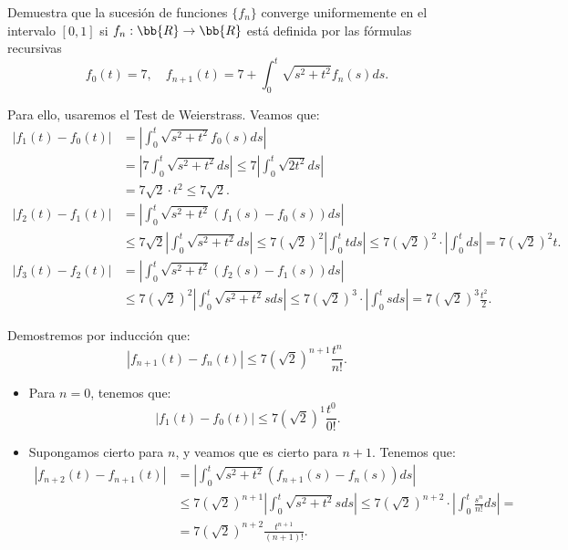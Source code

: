 \documentclass[12pt]{article}
\begin{document}
    \begin{ejercicio}
        Demuestra que la sucesión de funciones $\{f_n\}$ converge uniformemente en el intervalo $[0,1]$ si $f_n: \bb{R} \to \bb{R}$ está definida por las fórmulas recursivas
        \[
            f_0(t) = 7, \quad f_{n+1}(t) = 7 + \int_0^t \sqrt{s^2+t^2}f_n(s)ds.
        \]

        Para ello, usaremos el Test de Weierstrass. Veamos que:
        \begin{align*}
            |f_{1}(t)-f_0(t)|
            &= \left|\int_0^t \sqrt{s^2+t^2}f_0(s)ds\right| \\
            &= \left|7\int_0^t \sqrt{s^2+t^2}ds\right|
            \leq 7\left|\int_0^t \sqrt{2t^2}ds\right| \\
            &= 7\sqrt{2}\cdot t^2\leq 7\sqrt{2}.\\
            |f_2(t)-f_1(t)|
            &= \left|\int_0^t \sqrt{s^2+t^2}(f_1(s)-f_0(s))ds\right| \\
            &\leq 7\sqrt{2}\left|\int_0^t \sqrt{s^2+t^2}ds\right|
            \leq 7(\sqrt{2})^2\left|\int_0^t t ds\right|	
            \leq 7(\sqrt{2})^2 \cdot \left|\int_0^t ds\right|
            = 7(\sqrt{2})^2t.\\
            |f_3(t)-f_2(t)|
            &= \left|\int_0^t \sqrt{s^2+t^2}(f_2(s)-f_1(s))ds\right| \\
            &\leq 7(\sqrt{2})^2\left|\int_0^t \sqrt{s^2+t^2}s ds\right|
            \leq 7(\sqrt{2})^3 \cdot \left|\int_0^t sds\right|
            = 7(\sqrt{2})^3\frac{t^2}{2}.
        \end{align*}

        Demostremos por inducción que:
        \[
            |f_{n+1}(t)-f_n(t)|\leq 7(\sqrt{2})^{n+1}\frac{t^{n}}{n!}.
        \]
        \begin{itemize}
            \item Para $n=0$, tenemos que:
            \[
                |f_{1}(t)-f_0(t)|\leq 7(\sqrt{2})^{1}\frac{t^{0}}{0!}.
            \]

            \item Supongamos cierto para $n$, y veamos que es cierto para $n+1$. Tenemos que:
            \begin{align*}
                |f_{n+2}(t)-f_{n+1}(t)|
                &= \left|\int_0^t \sqrt{s^2+t^2}(f_{n+1}(s)-f_n(s))ds\right| \\
                &\leq 7(\sqrt{2})^{n+1}\left|\int_0^t \sqrt{s^2+t^2}s ds\right|
                \leq 7(\sqrt{2})^{n+2} \cdot \left|\int_0^t \frac{s^n}{n!}ds\right|
                =\\&= 7(\sqrt{2})^{n+2}\frac{t^{n+1}}{(n+1)!}.
            \end{align*}
        \end{itemize}


\end{ejercicio}
\end{document}
